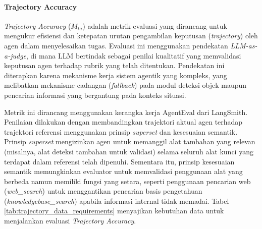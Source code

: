 \paragraph{Trajectory Accuracy}
\textit{Trajectory Accuracy} ($M_{ta}$) adalah metrik evaluasi yang dirancang untuk mengukur efisiensi dan ketepatan urutan pengambilan keputusan (\textit{trajectory}) oleh agen dalam menyelesaikan tugas. Evaluasi ini menggunakan pendekatan \textit{LLM-as-a-judge}, di mana LLM bertindak sebagai penilai kualitatif yang memvalidasi keputusan agen terhadap rubrik yang telah ditentukan. Pendekatan ini diterapkan karena mekanisme kerja sistem agentik yang kompleks, yang melibatkan mekanisme cadangan (\textit{fallback}) pada modul deteksi objek maupun pencarian informasi yang bergantung pada konteks situasi.

Metrik ini dirancang menggunakan kerangka kerja AgentEval dari LangSmith. Penilaian dilakukan dengan membandingkan trajektori aktual agen terhadap trajektori referensi menggunakan prinsip \textit{superset} dan kesesuaian semantik. Prinsip \textit{superset} mengizinkan agen untuk memanggil alat tambahan yang relevan (misalnya, alat deteksi tambahan untuk validasi) selama seluruh alat kunci yang terdapat dalam referensi telah dipenuhi. Sementara itu, prinsip kesesuaian semantik memungkinkan evaluator untuk memvalidasi penggunaan alat yang berbeda namun memiliki fungsi yang setara, seperti penggunaan pencarian web (\textit{web\_search}) untuk menggantikan pencarian basis pengetahuan (\textit{knowledgebase\_search}) apabila informasi internal tidak memadai. Tabel \ref{tab:trajectory_data_requirements} menyajikan kebutuhan data untuk menjalankan evaluasi \textit{Trajectory Accuracy}.

\begin{table}[H]
    \centering
    \caption{Kebutuhan Data untuk Evaluasi Trajectory Accuracy}
    \label{tab:trajectory_data_requirements}
    \small
\end{table}

